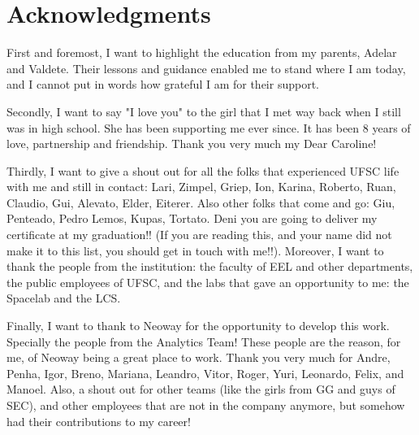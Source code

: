 \thispagestyle{plain}

\section*{Acknowledgments}

\indent First and foremost, I want to highlight the education from my parents, Adelar and Valdete. Their lessons and guidance enabled me to stand where I am today, and I cannot put in words how grateful I am for their support.

Secondly, I want to say "I love you" to the girl that I met way back when I still was in high school. She has been supporting me ever since. It has been 8 years of love, partnership and friendship. Thank you very much my Dear Caroline!

Thirdly, I want to give a shout out for all the folks that experienced UFSC life with me and still in contact: Lari, Zimpel, Griep, Ion, Karina, Roberto, Ruan, Claudio, Gui, Alevato, Elder, Eiterer. Also other folks that come and go: Giu, Penteado, Pedro Lemos, Kupas, Tortato. Deni you are going to deliver my certificate at my graduation!! (If you are reading this, and your name did not make it to this list, you should get in touch with me!!). Moreover, I want to thank the people from the institution: the faculty of EEL and other departments, the public employees of UFSC, and the labs that gave an opportunity to me: the Spacelab and the LCS.

Finally, I want to thank to Neoway for the opportunity to develop this work. Specially the people from the Analytics Team! These people are the reason, for me, of Neoway being a great place to work. Thank you very much for Andre, Penha, Igor, Breno, Mariana, Leandro, Vitor, Roger, Yuri, Leonardo, Felix, and Manoel. Also, a shout out for other teams (like the girls from GG and guys of SEC), and other employees that are not in the company anymore, but somehow had their contributions to my career!



\cleardoublepageempty
